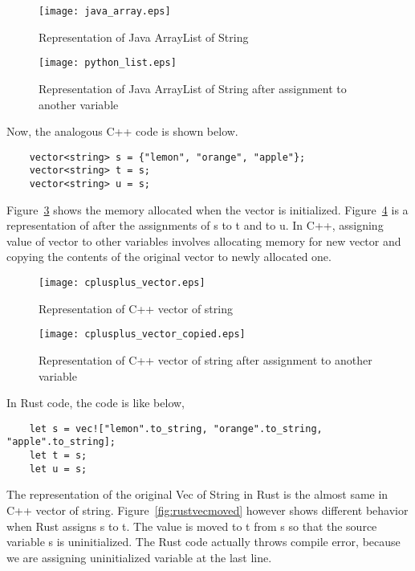 \begin{figure}[htb]
    \texttt{[image: java\_array.eps]}
    \caption{Representation of Java ArrayList of String}
    \label{fig:javalist}
\end{figure}

\begin{figure}[htb]
    \texttt{[image: python\_list.eps]}
    \caption{Representation of Java ArrayList of String after assignment to another variable}
    \label{fig:pythonlistcopied}
\end{figure}

Now, the analogous C++ code is shown below. 
\begin{lstlisting}
    vector<string> s = {"lemon", "orange", "apple"};
    vector<string> t = s;
    vector<string> u = s;
 \end{lstlisting}
Figure~\ref{fig:cpluscplusvector} shows the memory allocated when the vector is initialized. Figure~\ref{fig:cpluscplusvectorcopied} is a representation of after the assignments of s to t and to u. 
In C++, assigning value of vector to other variables involves allocating memory for new vector and copying the contents of the original vector to newly allocated one. 

\begin{figure}[htb]
    \texttt{[image: cplusplus\_vector.eps]}
    \caption{Representation of C++ vector of string}
    \label{fig:cpluscplusvector}
\end{figure}


\begin{figure}[htb]
    \texttt{[image: cplusplus\_vector\_copied.eps]}
    \caption{Representation of C++ vector of string after assignment to another variable}
    \label{fig:cpluscplusvectorcopied}
\end{figure}


In Rust code, the code is like below, 
\begin{lstlisting}
    let s = vec!["lemon".to_string, "orange".to_string, "apple".to_string];
    let t = s;
    let u = s;
 \end{lstlisting}

The representation of the original Vec of String in Rust is the almost same in C++ vector of string. Figure~\ref{fig:rustvecmoved} however shows different behavior when Rust assigns s to t. 
The value is moved to t from s so that the source variable s is uninitialized. The Rust code actually throws compile error, because we are assigning uninitialized variable at the last line.

